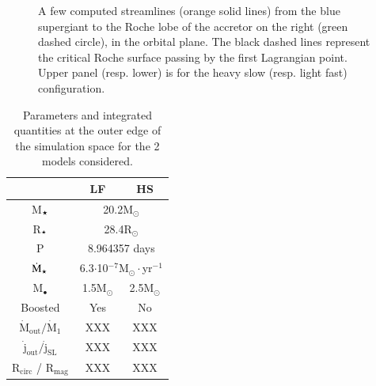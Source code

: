 \documentclass{aa}
\newcommand{\mystar}{{\fontfamily{lmr}\selectfont$\star$}}
\begin{document}
\begin{figure}
\begin{subfigure}{.5\textwidth}
  \label{fig:sfig2}
\end{subfigure}
\caption{A few computed streamlines (orange solid lines) from the blue supergiant to the Roche lobe of the accretor on the right (green dashed circle), in the orbital plane. The black dashed lines represent the critical Roche surface passing by the first Lagrangian point. Upper panel (resp. lower) is for the heavy slow (resp. light fast) configuration.}
\label{fig:big_picture}
\end{figure} 

\begin{table}
\centering
\caption{Parameters and integrated quantities at the outer edge of the simulation space for the 2 models considered.}
\label{tab:params}
\begin{tabularx}{\linewidth}{c|c|c}
   & LF & HS \\
  \hline
  M$_{\text{\mystar}}$ & \multicolumn{2}{c}{20.2M$_{\odot}$} \\
  R$_{\text{\mystar}}$ & \multicolumn{2}{c}{28.4R$_{\odot}$} \\
  P & \multicolumn{2}{c}{8.964357 days} \\  
  $\dot{\text{M}}_{\text{\mystar}}$ & \multicolumn{2}{c}{6.3$\cdot$10$^{-7}$M$_{\odot}\cdot$yr$^{-1}$} \\
  \hline
  M$_{\bullet}$ & 1.5M$_{\odot}$  & 2.5M$_{\odot}$  \\
  Boosted & Yes & No  \\
  \hline
  $\dot{\text{M}}_{\text{out}}/\dot{\text{M}}_1$ & XXX & XXX  \\
  $\dot{\text{j}}_{\text{out}}/\dot{\text{j}}_{\text{SL}}$ & XXX & XXX \\
  R$_{\text{circ}}$ / R$_{\text{mag}}$ & XXX & XXX \\
\end{tabularx}
\end{table}
\end{document}
